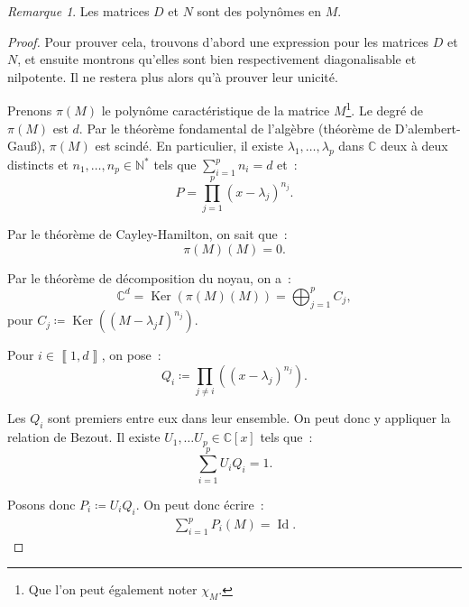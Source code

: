 \documentclass{report}
\theoremstyle{definition}
\theoremstyle{remark}
\newtheorem*{rmq}{Remarque}
\numberwithin{equation}{section}
\newcommand{\C}{\mathbb C}
\newcommand{\N}{\mathbb N}
\newcommand{\Ns}{\N^{*}}
\DeclareMathOperator{\Ker}{Ker}
\DeclareMathOperator{\Id}{Id}
\newcommand{\intint}[2]{\left\llbracket#1, #2\right\rrbracket}
\begin{document}
			\begin{rmq} Les matrices $D$ et $N$ sont des polynômes en $M$.
			\end{rmq}

			\begin{proof} Pour prouver cela, trouvons d'abord une expression pour les matrices $D$ et $N$, et ensuite montrons qu'elles sont bien respectivement
			diagonalisable et nilpotente. Il ne restera plus alors qu'à prouver leur unicité.

			Prenons $\pi(M)$ le polynôme caractéristique de la matrice $M$\footnote{Que l'on peut également noter $\chi_M$.}. Le degré de $\pi(M)$ est
			$d$. Par le théorème fondamental de l'algèbre (théorème de D'alembert-Gauß), $\pi(M)$ est scindé. En particulier, il existe $\lambda_1, \ldots, \lambda_p$
			dans $\C$ deux à deux distincts et $n_1, \ldots, n_p \in \Ns$ tels que $\sum_{i=1}^pn_i = d$ et~:
			\begin{equation}
				P = \prod_{j=1}^p\left(x- \lambda_j\right)^{n_j}.
			\end{equation}

			Par le théorème de Cayley-Hamilton, on sait que~:
			\begin{equation}
				\pi(M)(M) = 0.
			\end{equation}

			Par le théorème de décomposition du noyau, on a~:
			\begin{equation}
				\C^d = \Ker\left(\pi(M)(M)\right) = \bigoplus_{j=1}^pC_j,
			\end{equation}
			pour $C_j \coloneqq \Ker\left(\left(M - \lambda_jI\right)^{n_j}\right)$.

			Pour $i \in \intint 1d$, on pose~:
			\begin{equation}
				Q_i \coloneqq \prod_{j \neq i} \left(\left(x-\lambda_j\right)^{n_j}\right).
			\end{equation}

			Les $Q_i$ sont premiers entre eux dans leur ensemble. On peut donc y appliquer la relation de Bezout. Il existe $U_1, \ldots U_p \in \C[x]$ tels que~:
			\begin{equation}
				\sum_{i=1}^pU_iQ_i = 1.
			\end{equation}

			Posons donc $P_i \coloneqq U_iQ_i$. On peut donc écrire~:
			\begin{align}\label{eq:Dunford sum_Pi = Id}
				\sum_{i=1}^pP_i(M) = \Id.
			\end{align}


\end{proof}
\end{document}
